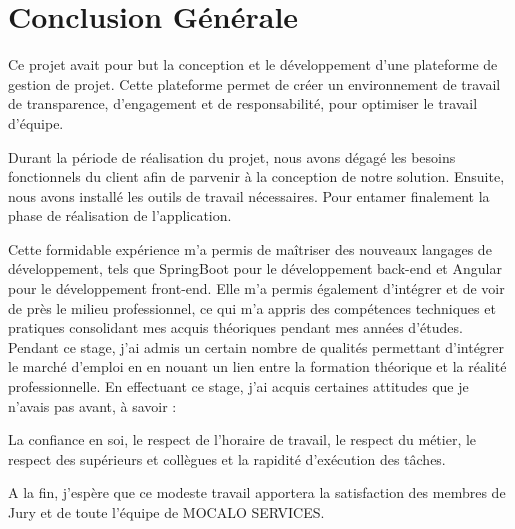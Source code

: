 \chapter*{ Conclusion Générale}
\markboth{}{}
\hspace{4mm}Ce projet avait pour but la conception et le développement d’une plateforme de gestion de projet. Cette plateforme permet de créer un environnement de travail de transparence, d’engagement et de responsabilité, pour optimiser le travail d’équipe. 

\hspace{4mm}

Durant la période de réalisation du projet, nous avons dégagé les besoins fonctionnels du client afin de parvenir à la conception de notre solution. Ensuite, nous avons installé les outils de travail nécessaires. Pour entamer finalement la phase de réalisation de l'application.

\hspace{4mm}

Cette formidable expérience m'a permis de maîtriser des nouveaux langages de développement, tels que SpringBoot
pour le développement back-end et Angular pour le développement front-end. Elle m'a permis également d'intégrer et de voir de près le milieu professionnel, ce qui m'a appris des compétences techniques et pratiques consolidant mes acquis théoriques pendant mes années d'études. Pendant ce stage, j'ai admis un certain nombre de qualités permettant d'intégrer le marché d’emploi en en nouant un lien entre la formation théorique et la réalité professionnelle. En effectuant ce stage, j'ai acquis certaines attitudes que je n'avais pas avant, à savoir : 

\par La confiance en soi, le respect de l'horaire de travail, le respect du métier, le respect des supérieurs et collègues et la rapidité d’exécution des tâches. 

\par
A la fin, j’espère que ce modeste travail apportera la satisfaction des membres de Jury et de toute l’équipe de MOCALO SERVICES. 
